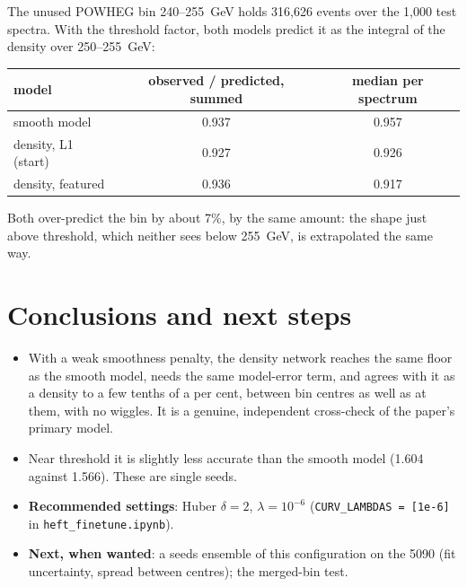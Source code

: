 \documentclass[11pt]{article}
\newcommand{\file}[1]{\nolinkurl{#1}}
\newcommand{\code}[1]{\texttt{#1}}
\begin{document}
The unused POWHEG bin 240--255~GeV holds 316,626 events over the 1,000 test spectra. With the threshold factor,
both models predict it as the integral of the density over 250--255~GeV:

\begin{center}
\small
\begin{tabular}{lcc}
\toprule
model & observed / predicted, summed & median per spectrum\\
\midrule
smooth model & 0.937 & 0.957\\
density, L1 (start) & 0.927 & 0.926\\
density, featured & 0.936 & 0.917\\
\bottomrule
\end{tabular}
\end{center}
Both over-predict the bin by about 7\%, by the same amount: the shape just above threshold, which neither sees below
255~GeV, is extrapolated the same way.

\section{Conclusions and next steps}

\begin{itemize}
  \item With a weak smoothness penalty, the density network reaches the same floor as the smooth model, needs the
    same model-error term, and agrees with it as a density to a few tenths of a per cent, between bin centres as
    well as at them, with no wiggles. It is a genuine, independent cross-check of the paper's primary model.
  \item Near threshold it is slightly less accurate than the smooth model (1.604 against 1.566). These are single
    seeds.
  \item \textbf{Recommended settings}: Huber $\delta = 2$, $\lambda = 10^{-6}$ (\code{CURV\_LAMBDAS = [1e-6]} in
    \file{heft_finetune.ipynb}).
  \item \textbf{Next, when wanted}: a seeds ensemble of this configuration on the 5090 (fit uncertainty, spread between
    centres); the merged-bin test.
\end{itemize}
\end{document}
